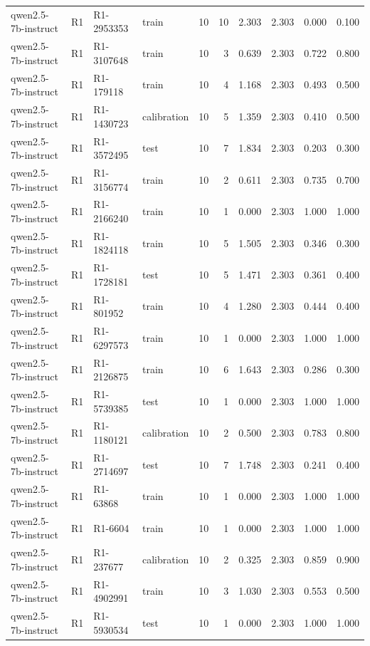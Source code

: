 \begin{table}
\begin{tabular}{llllrrrrrr}
qwen2.5-7b-instruct & R1 & R1-2953353 & train & 10 & 10 & 2.303 & 2.303 & 0.000 & 0.100 \\
qwen2.5-7b-instruct & R1 & R1-3107648 & train & 10 & 3 & 0.639 & 2.303 & 0.722 & 0.800 \\
qwen2.5-7b-instruct & R1 & R1-179118 & train & 10 & 4 & 1.168 & 2.303 & 0.493 & 0.500 \\
qwen2.5-7b-instruct & R1 & R1-1430723 & calibration & 10 & 5 & 1.359 & 2.303 & 0.410 & 0.500 \\
qwen2.5-7b-instruct & R1 & R1-3572495 & test & 10 & 7 & 1.834 & 2.303 & 0.203 & 0.300 \\
qwen2.5-7b-instruct & R1 & R1-3156774 & train & 10 & 2 & 0.611 & 2.303 & 0.735 & 0.700 \\
qwen2.5-7b-instruct & R1 & R1-2166240 & train & 10 & 1 & 0.000 & 2.303 & 1.000 & 1.000 \\
qwen2.5-7b-instruct & R1 & R1-1824118 & train & 10 & 5 & 1.505 & 2.303 & 0.346 & 0.300 \\
qwen2.5-7b-instruct & R1 & R1-1728181 & test & 10 & 5 & 1.471 & 2.303 & 0.361 & 0.400 \\
qwen2.5-7b-instruct & R1 & R1-801952 & train & 10 & 4 & 1.280 & 2.303 & 0.444 & 0.400 \\
qwen2.5-7b-instruct & R1 & R1-6297573 & train & 10 & 1 & 0.000 & 2.303 & 1.000 & 1.000 \\
qwen2.5-7b-instruct & R1 & R1-2126875 & train & 10 & 6 & 1.643 & 2.303 & 0.286 & 0.300 \\
qwen2.5-7b-instruct & R1 & R1-5739385 & test & 10 & 1 & 0.000 & 2.303 & 1.000 & 1.000 \\
qwen2.5-7b-instruct & R1 & R1-1180121 & calibration & 10 & 2 & 0.500 & 2.303 & 0.783 & 0.800 \\
qwen2.5-7b-instruct & R1 & R1-2714697 & test & 10 & 7 & 1.748 & 2.303 & 0.241 & 0.400 \\
qwen2.5-7b-instruct & R1 & R1-63868 & train & 10 & 1 & 0.000 & 2.303 & 1.000 & 1.000 \\
qwen2.5-7b-instruct & R1 & R1-6604 & train & 10 & 1 & 0.000 & 2.303 & 1.000 & 1.000 \\
qwen2.5-7b-instruct & R1 & R1-237677 & calibration & 10 & 2 & 0.325 & 2.303 & 0.859 & 0.900 \\
qwen2.5-7b-instruct & R1 & R1-4902991 & train & 10 & 3 & 1.030 & 2.303 & 0.553 & 0.500 \\
qwen2.5-7b-instruct & R1 & R1-5930534 & test & 10 & 1 & 0.000 & 2.303 & 1.000 & 1.000 \\

\end{tabular}
\end{table}
